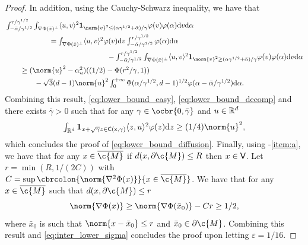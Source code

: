 \begin{proof}
	In addition, using the Cauchy-Schwarz inequality, we have that \begin{align}  & \textstyle \int_{-\bar{\alpha}/\gamma^{1/2}}^{r/\gamma^{1/2}} \int_{\nabla \Phi(\bar{x})^\perp} \langle u, v \rangle^2 \bm{1}_{\norm{v}^2 \leq (\alpha \gamma^{1/2} + \bar{\alpha})/\gamma} \varphi(v) \varphi(\alpha) \mathrm{d} v \mathrm{d} \alpha \\ & \qquad \qquad \qquad = \textstyle \int_{\nabla \Phi(\bar{x})^\perp} \langle u, v \rangle^2 \varphi(v) \mathrm{d} v \int_{-\bar{\alpha}/\gamma^{1/2}}^{r/\gamma^{1/2}} \varphi(\alpha) \mathrm{d} \alpha \\ &\qquad \qquad \qquad \qquad \qquad \qquad \qquad \textstyle - \int_{-\bar{\alpha}/\gamma^{1/2}}^{r/\gamma^{1/2}} \int_{\nabla \Phi(\bar{x})^\perp} \langle u, v \rangle^2 \bm{1}_{\norm{v}^2 \geq (\alpha \gamma^{1/2} + \bar{\alpha})/\gamma} \varphi(v) \varphi(\alpha) \mathrm{d} v \mathrm{d} \alpha \\ & \qquad \geq \textstyle (\norm{u}^2 - \alpha_u^2) ((1/2) - \Phi(r^2/\gamma,1)) \\ & \qquad \qquad \textstyle - \sqrt{3}(d-1) \norm{u}^2 \int_0^{+\infty} \Phi(\alpha/\gamma^{1/2},d-1)^{1/2} \varphi(\alpha - \bar{\alpha}/\gamma^{1/2}) \mathrm{d} \alpha .
	\end{align}
	Combining this result, \eqref{eq:lower_bound_easy}, \eqref{eq:lower_bound_decomp} and  there exists $\bar{\gamma} > 0$ such that for any $\gamma \in \ocbr{0, \bar{\gamma}}$ and $ u \in \mathbb{R}^d$ \begin{equation} \label{eq:inter_lower_sigma} \textstyle{\int_{\R^d} \bm{1}_{x+\sqrt{\gamma} z \in \sf{C}(x,\gamma)} \langle z, u\rangle^2 \varphi(z) \mathrm{d} z} \geq (1/4) \norm{u}^2 , \end{equation} which concludes the proof of \eqref{eq:lower_bound_diffusion}.
	Finally, using -\ref{item:a}, we have that for any $x \in \cl{\c{M}}$ if $d(x, \partial \c{M}) \leq R$ then $x \in \sf{V}$.
	Let $r = \min(R, 1/(2C))$ with $C = \sup \cbrcolon{\norm{\nabla^2 \Phi(x)}}{x \in \cl{\c{M}}}$.
	We have that for any $x \in \cl{\c{M}}$ such that $d(x, \partial \c{M})\leq r$ \begin{equation} \norm{\nabla \Phi(x)} \geq \norm{\nabla \Phi(\bar{x}_0)} - C r \geq 1/2 , \end{equation} where $\bar{x}_0$ is such that $\norm{x - \bar{x}_0} \leq r$ and $\bar{x}_0 \in \partial \c{M}$.
	Combining this result and \eqref{eq:inter_lower_sigma} concludes the proof upon letting $\varepsilon = 1/16$.
\end{proof}


